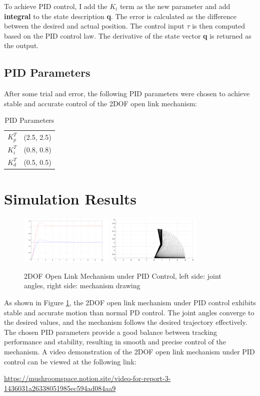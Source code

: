 \documentclass{article}
\begin{document}
To achieve PID control, I add the $K_i$ term as the new parameter and add \textbf{integral} to the state description \textbf{q}. The error is calculated as the difference between the desired and actual position. The control input \(\tau\) is then computed based on the PID control law. The derivative of the state vector \textbf{q} is returned as the output.

\subsection*{PID Parameters}
After some trial and error, the following PID parameters were chosen to achieve stable and accurate control of the 2DOF open link mechanism:
\begin{table}[h!]
  \centering
  \begin{tabular}{|c|c|}
    \hline
    \(K_p^T\) & (2.5, 2.5) \\
    \(K_i^T\) & (0.8, 0.8) \\
    \(K_d^T\) & (0.5, 0.5) \\
    \hline
  \end{tabular}
  \caption{PID Parameters}
  \label{tab:pid-params}
\end{table}
\section*{Simulation Results}

\begin{figure}[h!]
  \centering
  \includegraphics[width=0.4\textwidth]{assets/open_mechanism_2DOF_PID_angles.png}
  \includegraphics[width=0.4\textwidth]{assets/open_mechanism_2DOF_PID_draw.png}
  \caption{2DOF Open Link Mechanism under PID Control, left side: joint angles, right side: mechanism drawing}
  \label{fig:2dof-open-link-mechanism}
\end{figure}

As shown in Figure \ref{fig:2dof-open-link-mechanism}, the 2DOF open link mechanism under PID control exhibits stable and accurate motion than normal PD control. The joint angles converge to the desired values, and the mechanism follows the desired trajectory effectively. The chosen PID parameters provide a good balance between tracking performance and stability, resulting in smooth and precise control of the mechanism.
A video demonstration of the 2DOF open link mechanism under PID control can be viewed at the following link:

\url{https://mushroomspace.notion.site/video-for-report-3-1436031a26338051985ec594ad084aa9}
\end{document}
